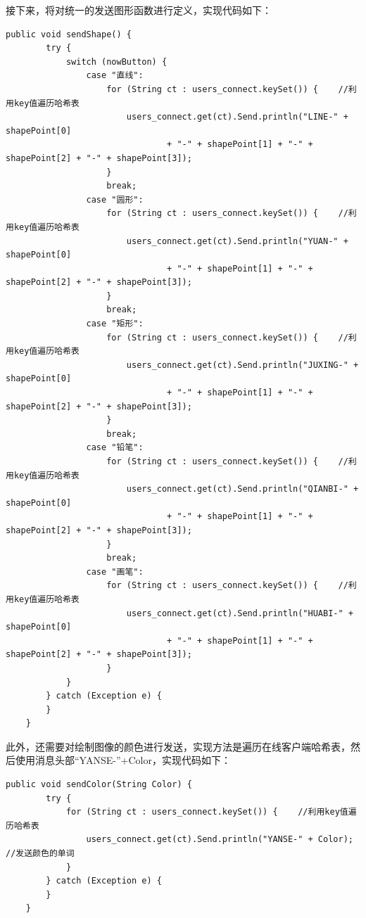 \documentclass[UTF8,12pt]{article}
\begin{document}
接下来，将对统一的发送图形函数进行定义，实现代码如下：
\begin{lstlisting}[title=统一的发送图形函数,frame=shadowbox]
    public void sendShape() {
        try {
            switch (nowButton) {
                case "直线":
                    for (String ct : users_connect.keySet()) {    //利用key值遍历哈希表
                        users_connect.get(ct).Send.println("LINE-" + shapePoint[0]
                                + "-" + shapePoint[1] + "-" + shapePoint[2] + "-" + shapePoint[3]);
                    }
                    break;
                case "圆形":
                    for (String ct : users_connect.keySet()) {    //利用key值遍历哈希表
                        users_connect.get(ct).Send.println("YUAN-" + shapePoint[0]
                                + "-" + shapePoint[1] + "-" + shapePoint[2] + "-" + shapePoint[3]);
                    }
                    break;
                case "矩形":
                    for (String ct : users_connect.keySet()) {    //利用key值遍历哈希表
                        users_connect.get(ct).Send.println("JUXING-" + shapePoint[0]
                                + "-" + shapePoint[1] + "-" + shapePoint[2] + "-" + shapePoint[3]);
                    }
                    break;
                case "铅笔":
                    for (String ct : users_connect.keySet()) {    //利用key值遍历哈希表
                        users_connect.get(ct).Send.println("QIANBI-" + shapePoint[0]
                                + "-" + shapePoint[1] + "-" + shapePoint[2] + "-" + shapePoint[3]);
                    }
                    break;
                case "画笔":
                    for (String ct : users_connect.keySet()) {    //利用key值遍历哈希表
                        users_connect.get(ct).Send.println("HUABI-" + shapePoint[0]
                                + "-" + shapePoint[1] + "-" + shapePoint[2] + "-" + shapePoint[3]);
                    }
            }
        } catch (Exception e) {
        }
    }
\end{lstlisting}

此外，还需要对绘制图像的颜色进行发送，实现方法是遍历在线客户端哈希表，然后使用消息头部“YANSE-”+Color，实现代码如下：
\begin{lstlisting}[title=绘制图像的颜色进行发送,frame=shadowbox]
    public void sendColor(String Color) {
        try {
            for (String ct : users_connect.keySet()) {    //利用key值遍历哈希表
                users_connect.get(ct).Send.println("YANSE-" + Color);     //发送颜色的单词
            }
        } catch (Exception e) {
        }
    }
\end{lstlisting}
\end{document}

